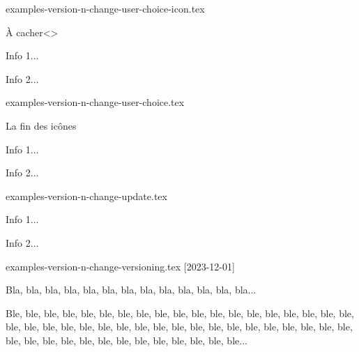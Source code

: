 \begin{filecontents*}[overwrite]{examples-version-n-change-user-choice-icon.tex}
\begin{tdoctopic}{À cacher}<\faEyeSlash>
    \item Info 1...
    \item Info 2...
\end{tdoctopic}
\end{filecontents*}


\begin{filecontents*}[overwrite]{examples-version-n-change-user-choice.tex}
\begin{tdoctopic}{La fin des icônes}
    \item Info 1...
    \item Info 2...
\end{tdoctopic}
\end{filecontents*}


\begin{filecontents*}[overwrite]{examples-version-n-change-update.tex}
\begin{tdocupdate}
    \item Info 1...
    \item Info 2...
\end{tdocupdate}
\end{filecontents*}


\begin{filecontents*}[overwrite]{examples-version-n-change-versioning.tex}
[2023-12-01]

Bla, bla, bla, bla, bla, bla, bla, bla, bla, bla, bla, bla, bla...

\bigskip %


Ble, ble, ble, ble, ble, ble, ble, ble, ble, ble, ble, ble, ble,
ble, ble, ble, ble, ble, ble, ble, ble, ble, ble, ble, ble, ble,
ble, ble, ble, ble, ble, ble, ble, ble, ble, ble, ble, ble, ble,
ble, ble, ble, ble, ble, ble, ble, ble, ble, ble, ble, ble...
\end{filecontents*}


